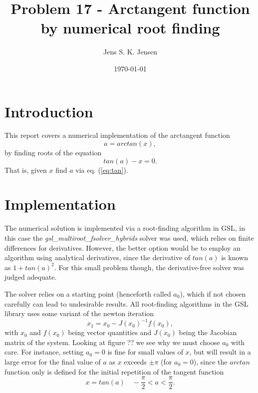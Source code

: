 \documentclass{article}
\begin{document}
\title{Problem 17 - Arctangent function by numerical root finding}
\author{Jens S. K. Jensen}
\date{\today}
\maketitle

\section{Introduction}
This report covers a numerical implementation of the arctangent function
\begin{equation}
	a = arctan(x),
	\label{eq:atan1}
\end{equation}
by finding roots of the equation
\begin{equation}
	tan(a) - x = 0.
	\label{eq:tan}
\end{equation}
That is, given $x$ find $a$ via eq. (\ref{eq:tan}).

\section{Implementation}
The numerical solution is implemented via a root-finding algorithm in GSL, in this case the \textit{gsl\_multiroot\_fsolver\_hybrids} solver was used, which relies on finite differences for derivatives. However, the better option would be to employ an algorithm using analytical derivatives, since the derivative of $tan(a)$ is known as $1+tan(a)^2$. For this small problem though, the derivative-free solver was judged adequate.

The solver relies on a starting point (henceforth called $a_0$), which if not chosen carefully can lead to undesirable results. All root-finding algorithms in the GSL library uses some variant of the newton iteration
\begin{equation}
	x_1 = x_0 - J(x_0)^{-1}f(x_0),
\end{equation}
with $x_0$ and $f(x_0)$ being vector quantities and $J(x_0)$ being the Jacobian matrix of the system. Looking at figure ?? we see why we must choose $a_0$ with care. For instance, setting $a_0 = 0$ is fine for small values of $x$, but will result in a large error for the final value of $a$ as $x$ exceeds $\pm \pi$ (for $a_0=0$), since the $arctan$ function only is defined for the initial repetition of the tangent function
\begin{equation}
	x = tan(a) \quad -\frac{\pi}{2}<a<\frac{\pi}{2}.
\end{equation}
\end{document}
